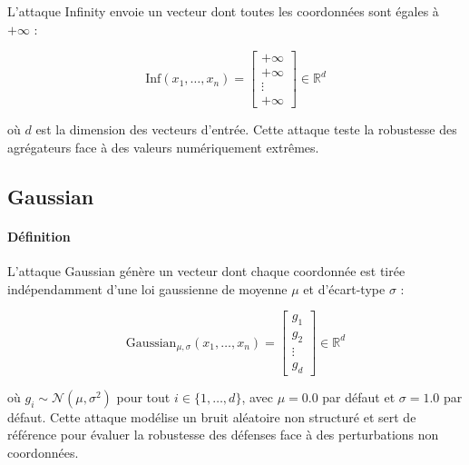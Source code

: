 \documentclass[a4paper,11pt]{article}
\begin{document}
L'attaque Infinity envoie un vecteur dont toutes les coordonnées sont égales à $+\infty$ :

\[
\mathrm{Inf}(x_1,\dots,x_n)
=
\begin{bmatrix} +\infty \\ +\infty \\ \vdots \\ +\infty \end{bmatrix}
\in \mathbb{R}^d
\]

où $d$ est la dimension des vecteurs d'entrée. Cette attaque teste la robustesse des agrégateurs face à des valeurs numériquement extrêmes.

\subsection{Gaussian}

\paragraph{Définition}

L'attaque Gaussian génère un vecteur dont chaque coordonnée est tirée indépendamment d'une loi gaussienne de moyenne $\mu$ et d'écart-type $\sigma$ :

\[
\mathrm{Gaussian}_{\mu,\sigma}(x_1,\dots,x_n)
=
\begin{bmatrix} g_1 \\ g_2 \\ \vdots \\ g_d \end{bmatrix}
\in \mathbb{R}^d
\]

où $g_i \sim \mathcal{N}(\mu, \sigma^2)$ pour tout $i \in \{1,\dots,d\}$, avec $\mu = 0.0$ par défaut et $\sigma = 1.0$ par défaut. Cette attaque modélise un bruit aléatoire non structuré et sert de référence pour évaluer la robustesse des défenses face à des perturbations non coordonnées.
\end{document}

